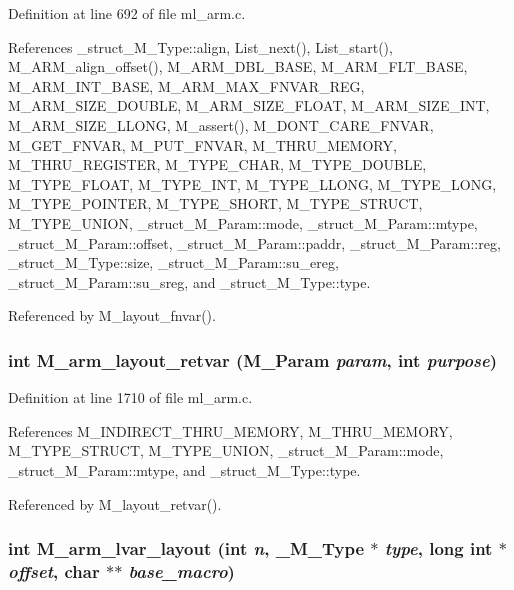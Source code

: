 Definition at line 692 of file ml\_\-arm.c.

References \_\-struct\_\-M\_\-Type::align, List\_\-next(), List\_\-start(), M\_\-ARM\_\-align\_\-offset(), M\_\-ARM\_\-DBL\_\-BASE, M\_\-ARM\_\-FLT\_\-BASE, M\_\-ARM\_\-INT\_\-BASE, M\_\-ARM\_\-MAX\_\-FNVAR\_\-REG, M\_\-ARM\_\-SIZE\_\-DOUBLE, M\_\-ARM\_\-SIZE\_\-FLOAT, M\_\-ARM\_\-SIZE\_\-INT, M\_\-ARM\_\-SIZE\_\-LLONG, M\_\-assert(), M\_\-DONT\_\-CARE\_\-FNVAR, M\_\-GET\_\-FNVAR, M\_\-PUT\_\-FNVAR, M\_\-THRU\_\-MEMORY, M\_\-THRU\_\-REGISTER, M\_\-TYPE\_\-CHAR, M\_\-TYPE\_\-DOUBLE, M\_\-TYPE\_\-FLOAT, M\_\-TYPE\_\-INT, M\_\-TYPE\_\-LLONG, M\_\-TYPE\_\-LONG, M\_\-TYPE\_\-POINTER, M\_\-TYPE\_\-SHORT, M\_\-TYPE\_\-STRUCT, M\_\-TYPE\_\-UNION, \_\-struct\_\-M\_\-Param::mode, \_\-struct\_\-M\_\-Param::mtype, \_\-struct\_\-M\_\-Param::offset, \_\-struct\_\-M\_\-Param::paddr, \_\-struct\_\-M\_\-Param::reg, \_\-struct\_\-M\_\-Type::size, \_\-struct\_\-M\_\-Param::su\_\-ereg, \_\-struct\_\-M\_\-Param::su\_\-sreg, and \_\-struct\_\-M\_\-Type::type.

Referenced by M\_\-layout\_\-fnvar().
\subsubsection{\setlength{\rightskip}{0pt plus 5cm}int M\_\-arm\_\-layout\_\-retvar (\bf{M\_\-Param} {\em param}, int {\em purpose})}\label{ml__arm_8c_15a45e6c2ddf64c320663238c96a5a6d}




Definition at line 1710 of file ml\_\-arm.c.

References M\_\-INDIRECT\_\-THRU\_\-MEMORY, M\_\-THRU\_\-MEMORY, M\_\-TYPE\_\-STRUCT, M\_\-TYPE\_\-UNION, \_\-struct\_\-M\_\-Param::mode, \_\-struct\_\-M\_\-Param::mtype, and \_\-struct\_\-M\_\-Type::type.

Referenced by M\_\-layout\_\-retvar().
\subsubsection{\setlength{\rightskip}{0pt plus 5cm}int M\_\-arm\_\-lvar\_\-layout (int {\em n}, \bf{\_\-M\_\-Type} $\ast$ {\em type}, long int $\ast$ {\em offset}, char $\ast$$\ast$ {\em base\_\-macro})}\label{ml__arm_8c_5bb3eaa54605e6a6b1446a2ee3a21e7b}




